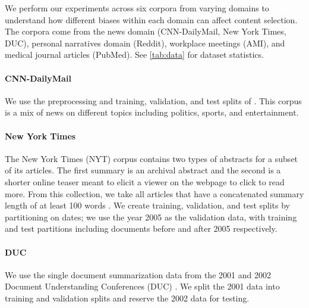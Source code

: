 We perform our experiments across six corpora from varying domains to 
understand how different biases within each domain can affect content 
selection. The corpora come from the news domain
(CNN-DailyMail, New York Times, DUC), personal narratives domain (Reddit),
workplace meetings (AMI), and medical journal articles (PubMed). See 
\autoref{tab:data} for dataset statistics.


\paragraph{CNN-DailyMail} We use the preprocessing and training, validation, 
and test splits
of \cite{see2017get}.
This corpus is a mix of news on different topics including politics,
sports, and entertainment.

\paragraph{New York Times}The New York Times (NYT) corpus \cite{sandhaus2008new} contains
 two types of abstracts for a subset of its articles. The first summary is
an archival abstract and the 
second is a shorter online teaser meant to elicit a viewer on the webpage to
click to read more. From this collection, we take all articles that have 
a concatenated summary length of at least 100 words
.
We create training, validation, and test splits by partitioning on dates;
we use the year 2005 as the validation data, with training and test partitions
including documents before and after 2005 respectively.

\paragraph{DUC} We use the single document summarization data from the 2001
and 2002
Document Understanding Conferences (DUC) \cite{over2002introduction}. We split the 2001 data into training
and validation splits and reserve the 2002 data for testing.

